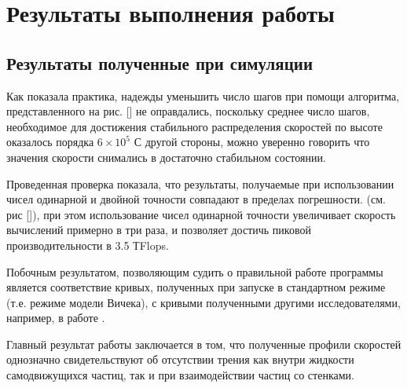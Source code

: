 \section{Результаты выполнения работы} %
\label{sec:WorkResults}	
    \subsection{Результаты полученные при симуляции} %
    \label{sub:ProgrammResults}
        Как показала практика, надежды уменьшить число шагов при помощи алгоритма, представленного на рис. [] не оправдались, поскольку среднее число шагов, необходимое для достижения стабильного распределения скоростей по высоте оказалось порядка $6 \times 10^5$ С другой стороны, можно уверенно говорить что значения скорости снимались в достаточно стабильном состоянии.

        Проведенная проверка показала, что результаты, получаемые при использовании чисел одинарной и двойной точности совпадают в пределах погрешности. (см. рис []), при этом использование чисел одинарной точности увеличивает скорость вычислений примерно в три раза, и позволяет достичь пиковой производительности в 3.5 ТFlops.

        Побочным результатом, позволяющим судить о правильной работе программы является соответствие кривых, полученных при запуске в стандартном режиме (т.е. режиме модели Вичека), с кривыми полученными другими исследователями, например, в работе \cite{vicsek1995}.

        Главный результат работы заключается в том, что полученные профили скоростей однозначно свидетельствуют об отсутствии трения как внутри жидкости самодвижущихся частиц, так и при взаимодействии частиц со стенками. 

